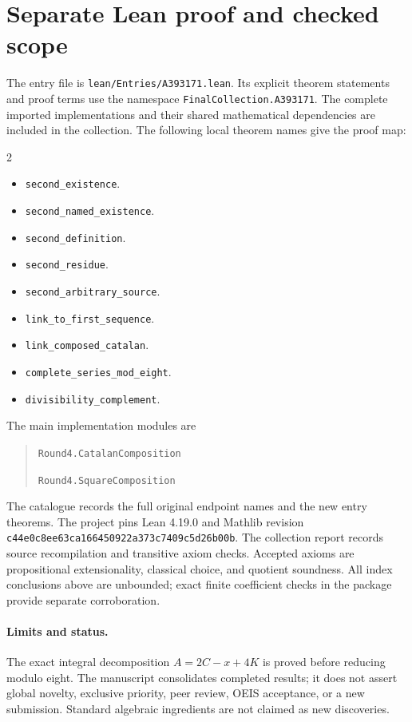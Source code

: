 \documentclass[11pt,a4paper]{article}
\theoremstyle{remark}
\begin{document}
\section{Separate Lean proof and checked scope}

The entry file is \nolinkurl{lean/Entries/A393171.lean}. Its explicit
theorem statements and proof terms use the namespace
\nolinkurl{FinalCollection.A393171}. The complete imported implementations
and their shared mathematical dependencies are included in the collection.
The following local theorem names give the proof map:

\begin{multicols}{2}\raggedright\begin{itemize}\setlength{\itemsep}{2pt}\setlength{\parsep}{0pt}
\item \nolinkurl{second_existence}.
\item \nolinkurl{second_named_existence}.
\item \nolinkurl{second_definition}.
\item \nolinkurl{second_residue}.
\item \nolinkurl{second_arbitrary_source}.
\item \nolinkurl{link_to_first_sequence}.
\item \nolinkurl{link_composed_catalan}.
\item \nolinkurl{complete_series_mod_eight}.
\item \nolinkurl{divisibility_complement}.
\end{itemize}\end{multicols}

The main implementation modules are
\begin{quote}\raggedright
\noindent\nolinkurl{Round4.CatalanComposition}\par
\noindent\nolinkurl{Round4.SquareComposition}\par
\end{quote}
The catalogue records the full original endpoint names and the new entry
theorems. The project pins Lean 4.19.0 and Mathlib revision
\nolinkurl{c44e0c8ee63ca166450922a373c7409c5d26b00b}. The collection
report records source recompilation and transitive axiom checks. Accepted
axioms are propositional extensionality, classical choice, and quotient
soundness. All index conclusions above are unbounded; exact finite
coefficient checks in the package provide separate corroboration.

\paragraph{Limits and status.}
The exact integral decomposition $A=2C-x+4K$ is proved before reducing modulo eight.
The manuscript consolidates completed results; it does not assert global
novelty, exclusive priority, peer review, OEIS acceptance, or a new submission.
Standard algebraic ingredients are not claimed as new discoveries.
\end{document}
